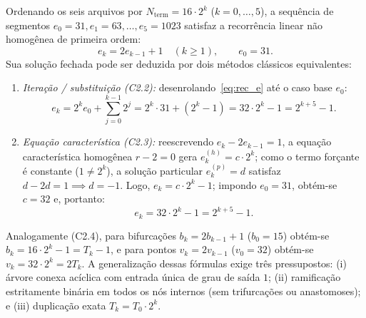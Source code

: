 \documentclass[11pt, a4paper]{article}
\begin{document}
Ordenando os seis arquivos por $N_{\mathrm{term}} = 16\cdot 2^k$ ($k = 0, \dots, 5$), a sequência de segmentos $e_0 = 31, e_1 = 63, \dots, e_5 = 1023$ satisfaz a recorrência linear não homogênea de primeira ordem:
\begin{equation}
  e_k = 2 e_{k-1} + 1 \quad (k \ge 1), \qquad e_0 = 31.
  \label{eq:rec_e}
\end{equation}
Sua solução fechada pode ser deduzida por dois métodos clássicos equivalentes:
\begin{enumerate}[leftmargin=*]
  \item \emph{Iteração / substituição (C2.2):} desenrolando~\eqref{eq:rec_e} até o caso base $e_0$:
  \[
    e_k = 2^k e_0 + \sum_{j=0}^{k-1} 2^j = 2^k \cdot 31 + (2^k - 1) = 32 \cdot 2^k - 1 = 2^{k+5} - 1.
  \]
  \item \emph{Equação característica (C2.3):} reescrevendo $e_k - 2 e_{k-1} = 1$, a equação característica homogênea $r - 2 = 0$ gera $e_k^{(h)} = c\cdot 2^k$; como o termo forçante é constante ($1 \neq 2^k$), a solução particular $e_k^{(p)} = d$ satisfaz $d - 2d = 1 \implies d = -1$. Logo, $e_k = c\cdot 2^k - 1$; impondo $e_0 = 31$, obtém-se $c = 32$ e, portanto:
  \begin{equation}
    e_k = 32 \cdot 2^k - 1 = 2^{k+5} - 1.
    \label{eq:sol_e}
  \end{equation}
\end{enumerate}
Analogamente (C2.4), para bifurcações $b_k = 2b_{k-1} + 1$ ($b_0 = 15$) obtém-se $b_k = 16\cdot 2^k - 1 = T_k - 1$, e para pontos $v_k = 2v_{k-1}$ ($v_0 = 32$) obtém-se $v_k = 32\cdot 2^k = 2T_k$. A generalização dessas fórmulas exige três pressupostos: (i) árvore conexa acíclica com entrada única de grau de saída $1$; (ii) ramificação estritamente binária em todos os nós internos (sem trifurcações ou anastomoses); e (iii) duplicação exata $T_k = T_0 \cdot 2^k$.
\end{document}
